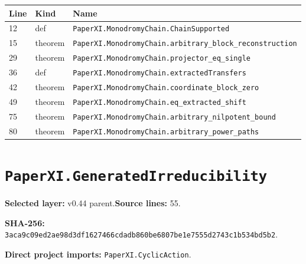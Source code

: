 \documentclass[10pt,oneside]{book}
\begin{document}
\begin{longtable}{@{}p{}p{}p{}@{}}\toprule Line&Kind&Name\\\midrule\endhead

12&def&\nolinkurl{PaperXI.MonodromyChain.ChainSupported}\\

15&theorem&\nolinkurl{PaperXI.MonodromyChain.arbitrary_block_reconstruction}\\

29&theorem&\nolinkurl{PaperXI.MonodromyChain.projector_eq_single}\\

36&def&\nolinkurl{PaperXI.MonodromyChain.extractedTransfers}\\

42&theorem&\nolinkurl{PaperXI.MonodromyChain.coordinate_block_zero}\\

49&theorem&\nolinkurl{PaperXI.MonodromyChain.eq_extracted_shift}\\

75&theorem&\nolinkurl{PaperXI.MonodromyChain.arbitrary_nilpotent_bound}\\

80&theorem&\nolinkurl{PaperXI.MonodromyChain.arbitrary_power_paths}\\

\bottomrule\end{longtable}

\section{\texorpdfstring{\nolinkurl{PaperXI.GeneratedIrreducibility}}{PaperXI.GeneratedIrreducibility}}\label{module:PaperXI.GeneratedIrreducibility}

\textbf{Selected layer:} v0.44 parent.\quad\textbf{Source lines:} 55.\par\textbf{SHA-256:} {\scriptsize\nolinkurl{3aca9c09ed2ae98d3df1627466cdadb860be6807be1e7555d2743c1b534bd5b2}}.


\textbf{Direct project imports:} \nolinkurl{PaperXI.CyclicAction}.
\end{document}
